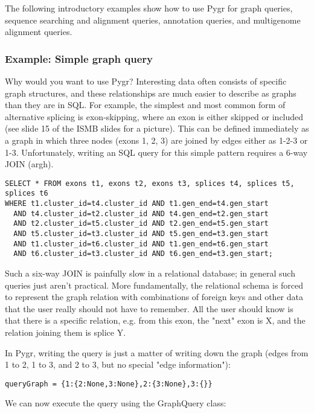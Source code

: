 \documentclass{howto}
\begin{document}
The following introductory examples show how to use Pygr for graph queries, sequence searching and alignment queries, annotation queries, and multigenome alignment queries.


\subsubsection{Example: Simple graph query}
Why would you want to use Pygr?  Interesting data often consists of specific graph structures, and these relationships are much easier to describe as graphs than they are in SQL.  For example, the simplest and most common form of alternative splicing is exon-skipping, where an exon is either skipped or included (see slide 15 of the ISMB slides for a picture).  This can be defined immediately as a graph in which three nodes (exons 1, 2, 3) are joined by edges either as 1-2-3 or 1-3.  Unfortunately, writing an SQL query for this simple pattern requires a 6-way JOIN (argh).

\begin{verbatim}
SELECT * FROM exons t1, exons t2, exons t3, splices t4, splices t5, splices t6 
WHERE t1.cluster_id=t4.cluster_id AND t1.gen_end=t4.gen_start 
  AND t4.cluster_id=t2.cluster_id AND t4.gen_end=t2.gen_start 
  AND t2.cluster_id=t5.cluster_id AND t2.gen_end=t5.gen_start 
  AND t5.cluster_id=t3.cluster_id AND t5.gen_end=t3.gen_start 
  AND t1.cluster_id=t6.cluster_id AND t1.gen_end=t6.gen_start 
  AND t6.cluster_id=t3.cluster_id AND t6.gen_end=t3.gen_start;
\end{verbatim}

Such a six-way JOIN is painfully slow in a relational database; in general such queries just aren't practical.  More fundamentally, the relational schema is forced to represent the graph relation with combinations of foreign keys and other data that the user really should not have to remember.  All the user should know is that there is a specific relation, e.g. from this exon, the "next" exon is X, and the relation joining them is splice Y.

In Pygr, writing the query is just a matter of writing down the graph (edges from 1 to 2, 1 to 3, and 2 to 3, but no special "edge information"):

\begin{verbatim}
queryGraph = {1:{2:None,3:None},2:{3:None},3:{}}
\end{verbatim}

We can now execute the query using the GraphQuery class:
\end{document}
